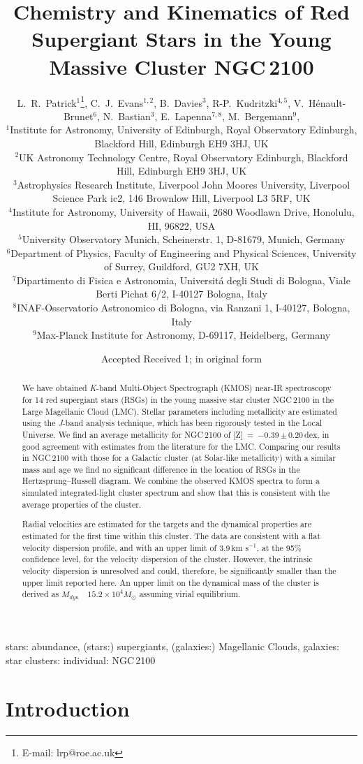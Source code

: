 \documentclass[useAMS,usenatbib]{mn2e}
\title[Chemistry and Kinematics of NGC\,2100]{Chemistry and Kinematics of Red Supergiant Stars in the Young Massive Cluster NGC\,2100}
\author[L.~R.~Patrick et al.]{L.~R.~Patrick$^{1}$\thanks{E-mail: lrp@roe.ac.uk},
C.~J.~Evans$^{1, 2}$,
B.~Davies$^{3}$,
R-P.~Kudritzki$^{4,5}$,
V.~H{\'e}nault-Brunet$^{6}$,
\newauthor N.~Bastian$^{3}$,
E.~Lapenna$^{7,8}$, M.~Bergemann$^{9}$,\\
$^{1}$Institute for Astronomy, University of Edinburgh, Royal Observatory Edinburgh, Blackford Hill, Edinburgh EH9 3HJ, UK\\
$^{2}$UK Astronomy Technology Centre, Royal Observatory Edinburgh, Blackford Hill, Edinburgh EH9 3HJ, UK\\
$^{3}$Astrophysics Research Institute, Liverpool John Moores University, Liverpool Science Park ic2, 146 Brownlow Hill, Liverpool L3 5RF, UK\\
$^{4}$Institute for Astronomy, University of Hawaii, 2680 Woodlawn Drive, Honolulu, HI, 96822, USA\\
$^{5}$University Observatory Munich, Scheinerstr. 1, D-81679, Munich, Germany\\
$^{6}$Department of Physics, Faculty of Engineering and Physical Sciences, University of Surrey, Guildford, GU2 7XH, UK\\
$^{7}$Dipartimento di Fisica e Astronomia, Universit\'a degli Studi di Bologna, Viale Berti Pichat 6/2, I-40127 Bologna, Italy\\
$^{8}$INAF-Osservatorio Astronomico di Bologna, via Ranzani 1, I-40127, Bologna, Italy\\
$^{9}$Max-Planck Institute for Astronomy, D-69117, Heidelberg, Germany\\
}
\def\kms{$\mbox{km s}^{-1}$}
\begin{document}
\date{Accepted  Received 1; in original form}

\pagerange{\pageref{firstpage}--\pageref{lastpage}} 

\maketitle

\label{firstpage}

\begin{abstract}

\noindent We have obtained {\it K}-band Multi-Object Spectrograph (KMOS) near-IR spectroscopy for 14 red supergiant stars (RSGs) in the young massive star cluster NGC\,2100 in the Large Magellanic Cloud (LMC).
Stellar parameters including metallicity are estimated using the {\it J}-band analysis technique, which has been rigorously tested in the Local Universe.
We find an average metallicity for NGC\,2100 of [Z]~=~$-$0.39\,$\pm$\,0.20\,dex, in good agreement with estimates from the literature for the LMC.
Comparing our results in NGC\,2100 with those for a Galactic cluster (at Solar-like metallicity) with a similar mass and age we find no significant difference in the location of RSGs in the Hertzsprung--Russell diagram.
We combine the observed KMOS spectra to form a simulated integrated-light cluster spectrum and show that this is consistent with the average properties of the cluster.

Radial velocities are estimated for the targets and the dynamical properties are estimated for the first time within this cluster.
The data are consistent with a flat velocity dispersion profile, and with an upper limit of 3.9\,\kms, at the 95\% confidence level, for the velocity dispersion of the cluster.
However, the intrinsic velocity dispersion is unresolved and could, therefore, be significantly smaller than the upper limit reported here.
An upper limit on the dynamical mass of the cluster is derived as
$M_{dyn}$~\le~$15.2\times10^{4}M_{\odot}$ assuming virial equilibrium.
\end{abstract}

\begin{keywords}
stars: abundance, (stars:) supergiants, (galaxies:) Magellanic Clouds, galaxies: star clusters: individual: NGC\,2100
\end{keywords}

\section{Introduction} %
\label{sec:introduction}
\end{document}
